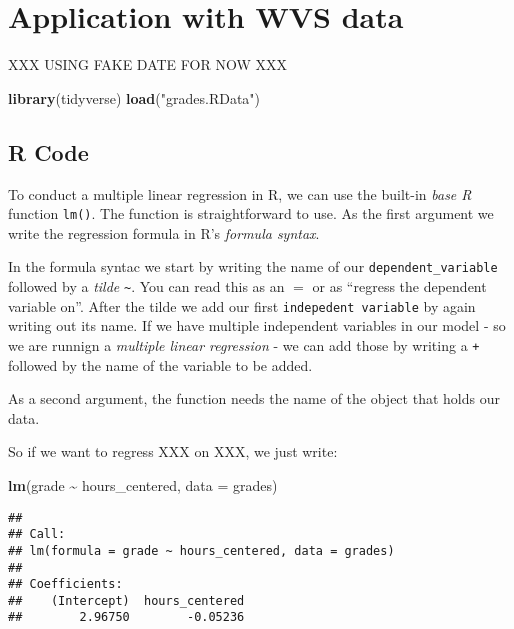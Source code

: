 \documentclass[
]{book}
\newenvironment{Shaded}{\begin{snugshade}}{\end{snugshade}}
\newcommand{\AttributeTok}[1]{\textcolor[rgb]{0.13,0.29,0.53}{#1}}
\newcommand{\FunctionTok}[1]{\textcolor[rgb]{0.13,0.29,0.53}{\textbf{#1}}}
\newcommand{\NormalTok}[1]{#1}
\newcommand{\SpecialCharTok}[1]{\textcolor[rgb]{0.81,0.36,0.00}{\textbf{#1}}}
\newcommand{\StringTok}[1]{\textcolor[rgb]{0.31,0.60,0.02}{#1}}
\begin{document}
\hypertarget{application-with-wvs-data}{%
\section{Application with WVS data}\label{application-with-wvs-data}}

XXX USING FAKE DATE FOR NOW XXX

\begin{Shaded}
\begin{Highlighting}[]
\FunctionTok{library}\NormalTok{(tidyverse)}
\FunctionTok{load}\NormalTok{(}\StringTok{"grades.RData"}\NormalTok{)}
\end{Highlighting}
\end{Shaded}

\hypertarget{r-code}{%
\subsection{R Code}\label{r-code}}

To conduct a multiple linear regression in R, we can use the built-in \emph{base R}
function \texttt{lm()}. The function is straightforward to use. As the first argument
we write the regression formula in R's \emph{formula syntax}.

In the formula syntac we start by writing the name of our \texttt{dependent\_variable}
followed by a \emph{tilde} \texttt{\textasciitilde{}}. You can read this as an \(=\) or as ``regress the
dependent variable on''. After the tilde we add our first \texttt{indepedent\ variable}
by again writing out its name. If we have multiple independent variables in our
model - so we are runnign a \emph{multiple linear regression} - we can add those by
writing a \texttt{+} followed by the name of the variable to be added.

As a second argument, the function needs the name of the object that holds our
data.

So if we want to regress XXX on XXX, we just write:

\begin{Shaded}
\begin{Highlighting}[]
\FunctionTok{lm}\NormalTok{(grade }\SpecialCharTok{\textasciitilde{}}\NormalTok{ hours\_centered, }\AttributeTok{data =}\NormalTok{ grades)}
\end{Highlighting}
\end{Shaded}

\begin{verbatim}
## 
## Call:
## lm(formula = grade ~ hours_centered, data = grades)
## 
## Coefficients:
##    (Intercept)  hours_centered  
##        2.96750        -0.05236
\end{verbatim}
\end{document}

